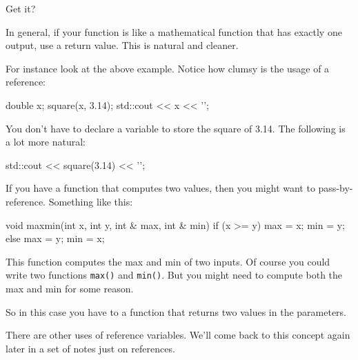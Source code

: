 Get it?






In general, if your function is like a mathematical function that has exactly one output, use a return value. This is natural and cleaner.

For instance look at the above example. Notice how clumsy is the usage of a reference:

\begin{consolethree}[escapeinside=||]
double x;
square(x, 3.14);
std::cout << x << '\n';
\end{consolethree}

You don't have to declare a variable to store the square of 3.14. The following is a lot more natural:

\begin{consolethree}[escapeinside=||]
std::cout << square(3.14) << '\n';
\end{consolethree}

If you have a function that computes two values, then you might want to pass-by-reference. Something like this:

\begin{consolethree}[escapeinside=||]
void maxmin(int x, int y, int & max, int & min)
{
    if (x >= y)
    {
        max = x;
        min = y;
    }
    else
    {
        max = y;
        min = x;
    }
}
\end{consolethree}

This function computes the max and min of two inputs. Of course you could write two functions \texttt{max()} and \texttt{min()}. But you might need to compute both the max and min for some reason.

So in this case you have to a function that returns two values in the parameters.

There are other uses of reference variables. We'll come back to this concept again later in a set of notes just on references.


